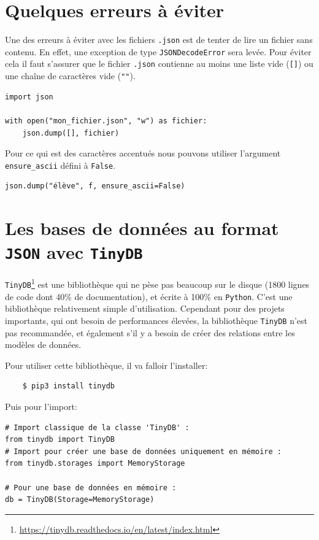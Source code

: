 \documentclass[a4paper,11pt]{book}
\begin{document}
\section{Quelques erreurs à éviter}
Une des erreurs à éviter avec les fichiers \texttt{.json} est de tenter de lire un fichier sans contenu. En effet, une exception de type \texttt{JSONDecodeError} sera levée. Pour éviter cela il faut s'assurer que le fichier \texttt{.json} contienne au moins une liste vide (\texttt{[]}) ou une chaîne de caractères vide (\texttt{""}).
\begin{lstlisting}[caption=Créer un fichier \texttt{.json} contenant une liste vide.]
import json

with open("mon_fichier.json", "w") as fichier:
    json.dump([], fichier)
\end{lstlisting}
\medskip

Pour ce qui est des caractères accentués nous pouvons utiliser l'argument \texttt{ensure\_ascii} défini à \texttt{False}.
\begin{lstlisting}[caption=L'argument \texttt{ensure\_ascii}.]
json.dump("élève", f, ensure_ascii=False)
\end{lstlisting}
\medskip

\section{Les bases de données au format \texttt{JSON} avec \texttt{TinyDB}}
\texttt{TinyDB}\footnote{\url{https://tinydb.readthedocs.io/en/latest/index.html}} est une bibliothèque qui ne pèse pas beaucoup sur le disque (1800 lignes de code dont 40\% de documentation), et écrite à 100\% en \texttt{Python}. C'est une bibliothèque relativement simple d'utilisation. Cependant pour des projets importants, qui ont besoin de performances élevées, la bibliothèque \texttt{TinyDB} n'est pas recommandée, et également s'il y a besoin de créer des relations entre les modèles de données.
\medskip

Pour utiliser cette bibliothèque, il va falloir l'installer:
\begin{verbatim}
    $ pip3 install tinydb
\end{verbatim}
\medskip

Puis pour l'import:
\begin{lstlisting}[caption=Import de \texttt{TinyDB}]
# Import classique de la classe 'TinyDB' :
from tinydb import TinyDB
# Import pour créer une base de données uniquement en mémoire :
from tinydb.storages import MemoryStorage

# Pour une base de données en mémoire :
db = TinyDB(Storage=MemoryStorage)
\end{lstlisting}
\medskip
\end{document}

